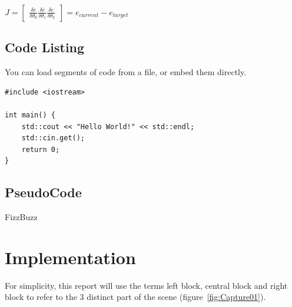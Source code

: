 \documentclass[10pt, a4paper]{article}
\begin{document}
    {\centering \Large \(
        J = \begin{bmatrix}
            \frac{\delta e}{\delta \theta _0}
            \frac{\delta e}{\delta \theta _1}
            \frac{\delta e}{\delta \theta _2}
        \end{bmatrix}
        = e_{current} - e_{target} 
    \)\par}
	
	\subsection{Code Listing}
    You can load segments of code from a file, or embed them directly.
    
\begin{lstlisting}[caption = Hello World! in c++]
#include <iostream>

int main() {
    std::cout << "Hello World!" << std::endl;
    std::cin.get();
    return 0;
}
\end{lstlisting}


    
\subsection{PseudoCode}

\begin{algorithm}[h]
\caption{FizzBuzz}
\end{algorithm}

\section{Implementation}
	
For simplicity, this report will use the terms left block, central block and right block to refer to the 3 distinct part of the scene (figure~\ref{fig:Capture01}).
	
\end{document}
